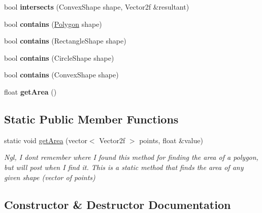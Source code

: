 \begin{DoxyCompactItemize}
bool {\bfseries intersects} (Convex\+Shape shape, Vector2f \&resultant)
\item 
\mbox{\label{class_polygon_a1501a824c6d97ce3ef8efc5443ab1f8e}} 
bool {\bfseries contains} (\mbox{\hyperlink{class_polygon}{Polygon}} shape)
\item 
\mbox{\label{class_polygon_a1712cd82ff38472dd9ba87f0f8b37a9f}} 
bool {\bfseries contains} (Rectangle\+Shape shape)
\item 
\mbox{\label{class_polygon_a60fe86ef61eeb9903a8eef32870ea1c4}} 
bool {\bfseries contains} (Circle\+Shape shape)
\item 
\mbox{\label{class_polygon_aea5d69a1006a0b6b08dbc3e236b302ea}} 
bool {\bfseries contains} (Convex\+Shape shape)
\item 
\mbox{\label{class_polygon_a00dc79655e7be6b73a83414a6733ec9a}} 
float {\bfseries get\+Area} ()
\end{DoxyCompactItemize}
\subsection*{Static Public Member Functions}
\begin{DoxyCompactItemize}
\item 
static void \mbox{\hyperlink{class_polygon_a21a607cdb559f8e4a98fa54d0b9d63a9}{get\+Area}} (vector$<$ Vector2f $>$ points, float \&value)
\begin{DoxyCompactList}\small\item\em Ngl, I don\textquotesingle{}t remember where I found this method for finding the area of a polygon, but will post when I find it. This is a static method that finds the area of any given shape (vector of points) \end{DoxyCompactList}\end{DoxyCompactItemize}


\subsection{Constructor \& Destructor Documentation}
\mbox{\label{class_polygon_a55f28f7bcae8df65ea11b99ff192b7d7}} 
